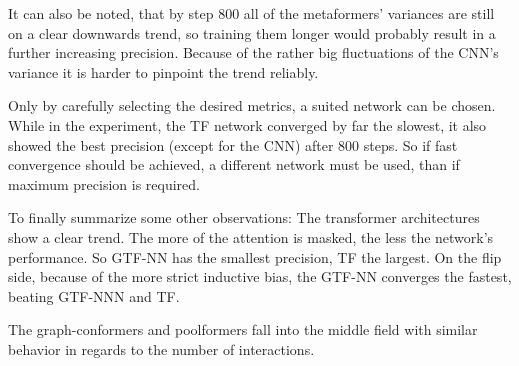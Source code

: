 It can also be noted, that by step 800 all of the metaformers' variances are still on a clear downwards trend, so training them longer would probably result in a further increasing precision.
Because of the rather big fluctuations of the CNN's variance it is harder to pinpoint the trend reliably.

Only by carefully selecting the desired metrics, a suited network can be chosen. 
While in the experiment, the TF network converged by far the slowest, it also showed the best precision (except for the CNN) after 800 steps. 
So if fast convergence should be achieved, a different network must be used, than if maximum precision is required.

To finally summarize some other observations: The transformer architectures show a clear trend. 
The more of the attention is masked, the less the network's performance. 
So GTF-NN has the smallest precision, TF the largest. On the flip side, because of the more strict inductive bias, the GTF-NN converges the fastest, beating GTF-NNN and TF.

The graph-conformers and poolformers fall into the middle field with similar behavior in regards to the number of interactions.
